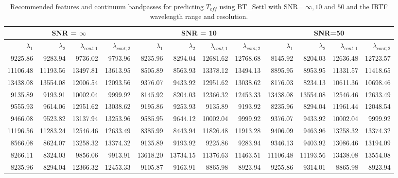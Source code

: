 \begin{table*}
\begin{center}

  \begin{tabular}{rrrr | rrrr | rrrr }
  \hline
 \multicolumn{4}{c}{SNR = $\infty$ } & \multicolumn{4}{c}{SNR = 10} &  \multicolumn{4}{c}{SNR=50} \\
  \hline
$\lambda_1$ & $\lambda_2$ & $\lambda_{cont;1}$ & $\lambda_{cont;2} $ & $\lambda_1$ & $\lambda_2$ & $\lambda_{cont;1}$ & $\lambda_{cont;2} $ & $\lambda_1$ & $\lambda_2$ & $\lambda_{cont;1}$ & $\lambda_{cont;2} $ \\ 
  \hline
9225.86  & 9283.94   & 9736.02  & 9793.96  & 8235.96  & 8294.04   & 12681.62 & 12768.68   &  8145.92 & 8204.03   & 12636.48 & 12723.57 \\   
11106.48 & 11193.56  & 13497.81 & 13613.95 & 8505.89  & 8563.93   & 13378.12 & 13494.13   &  8895.95 & 8953.95   & 11331.57 & 11418.65 \\     
13438.08 & 13554.08  & 12006.54 & 12093.56 & 9376.07  & 9433.92   & 12951.62 & 13038.62   &  8176.03 & 8234.13   & 10611.36 & 10698.46 \\      
9135.89  & 9193.91   & 10002.04 & 9999.92  & 8145.92  & 8204.03   & 12366.32 & 12453.33   &  13438.08 & 13554.08 & 12546.46 & 12633.49 \\     
9555.93  & 9614.06   & 12951.62 & 13038.62 & 9195.86  & 9253.93   & 9135.89 & 9193.92     &  8235.96 & 8294.04   & 11961.44 & 12048.54 \\      
9466.08  & 9523.82   & 13137.94 & 13253.96 & 9585.95  & 9644.12   & 10002.04 & 9999.92    &  9376.07 & 9433.92   & 10002.04 & 9999.92  \\   
11196.56 & 11283.24  & 12546.46 & 12633.49 & 8385.99  & 8443.94   & 11826.48 & 11913.28   &  9406.09 & 9463.96   & 13258.32 & 13374.32 \\    
8566.08  & 8624.07   & 13258.32 & 13374.32 & 9135.89  & 9193.92   & 9225.86 & 9283.94     &  9346.13 & 9403.92   & 13086.46 & 13194.09 \\   
8266.11  & 8324.03   & 9856.06  & 9913.91  & 13618.20 & 13734.15  & 11376.63 & 11463.51   &  11106.48 & 11193.56 & 13438.08 & 13554.08 \\    
8235.96  & 8294.04   & 12366.32 & 12453.33 & 9105.87  & 9163.91   & 8865.98 & 8923.94     &  9255.86 & 9314.01   & 8865.98  & 8923.94  \\    
\hline
\end{tabular}
\caption {Recommended features and continuum bandpasses for predicting
  $ T_{eff} $ using BT\_Settl with SNR= $ \infty ,  10 $ and $50$ and the IRTF
  wavelength range and resolution.} \label{tab:irtf-teff-noisy}
\end{center}
\end{table*}

